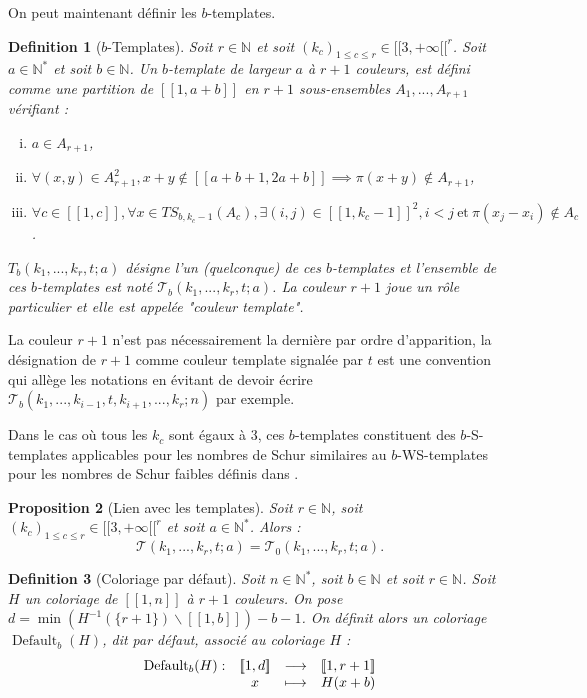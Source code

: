 \documentclass{article}
\newtheorem{definition}{Definition}[section]
\newtheorem{proposition}[definition]{Proposition}
\DeclareMathOperator{\coldef}{Default}
\newcommand{\TS}{\mathit{TS}}
\begin{document}
On peut maintenant définir les \(b\)-templates.

\begin{definition}[\(b\)-Templates]
Soit \(r \in \mathbb{N}\) et soit \((k_c)_{1 \leqslant c \leqslant r} \in {[\![3, +\infty[\![}^r\). Soit \(a \in \mathbb{N}^*\) et soit \(b \in \mathbb{N}\).  Un \(b\)-template de largeur \(a\) à \(r + 1\) couleurs, est défini comme une partition de \([\![1, a + b]\!]\) en \(r+1\) sous-ensembles \(A_1, ..., A_{r+1}\) vérifiant :
\begin{enumerate}[(i)]
\item \(a \in A_{r+1}\),
\item \(\forall (x, y) \in A_{r + 1}^2, x + y \notin [\![a + b + 1, 2 a + b]\!] \implies \pi(x + y) \notin A_{r + 1}\),
\item \(\forall c \in [\![1, c]\!], \forall x \in \TS_{b, k_c - 1}(A_c), \exists (i, j) \in {[\![1, k_c - 1]\!]}^2, i < j ~\text{et}~ \pi(x_j - x_i) \notin A_c\).
\end{enumerate}
 \(T_b(k_1, ..., k_r, t; a)\) désigne l'un (quelconque) de ces \(b\)-templates et l'ensemble de ces \(b\)-templates est noté \(\mathcal{T}_b(k_1, ..., k_r, t; a)\).  La couleur \(r + 1\) joue un rôle particulier et elle est appelée "couleur template".
\end{definition}

La couleur \(r + 1\)  n'est pas nécessairement la dernière par ordre d'apparition, la désignation de \(r+1\) comme couleur template signalée par \(t\) est une convention qui allège les notations en évitant de devoir écrire \(\mathcal{T}_b(k_1, ..., k_{i - 1}, t,  k_{i + 1}, ..., k_r; n)\) par exemple.

Dans le cas où tous les \(k_c\) sont égaux à 3, ces \(b\)-templates constituent des \(b\)-S-templates applicables pour les nombres de Schur similaires au \(b\)-WS-templates pour les nombres de Schur faibles définis dans \cite{schurboyz}.

\begin{proposition}[Lien avec les templates]
Soit \(r \in \mathbb{N}\), soit \((k_c)_{1 \leqslant c \leqslant r} \in {[\![3, +\infty[\![}^r\) et soit \(a \in \mathbb{N}^*\). Alors :
\[ \mathcal{T}(k_1, ..., k_r, t; a) = \mathcal{T}_0(k_1, ..., k_r, t; a). \]
\end{proposition}

\begin{definition}[Coloriage par défaut]
Soit \(n \in \mathbb{N}^*\), soit \(b \in \mathbb{N}\) et soit \(r \in \mathbb{N}\). Soit \(H\) un coloriage de \([\![1, n]\!]\) à \(r +1\) couleurs. On pose \(d = \min \left(H^{-1}(\{r + 1\}) \backslash [\![1, b]\!] \right) - b  - 1\). On définit alors un coloriage \(\coldef_b(H)\), dit par défaut, associé au coloriage \(H\) :
\[\begin{array}{c c c c}
	\coldef_b(H) : & [\![1, d]\!] & \longrightarrow & [\![1, r + 1]\!] \\
	 & x & \longmapsto & H(x + b)
\end{array}\]
\end{definition}
\end{document}
